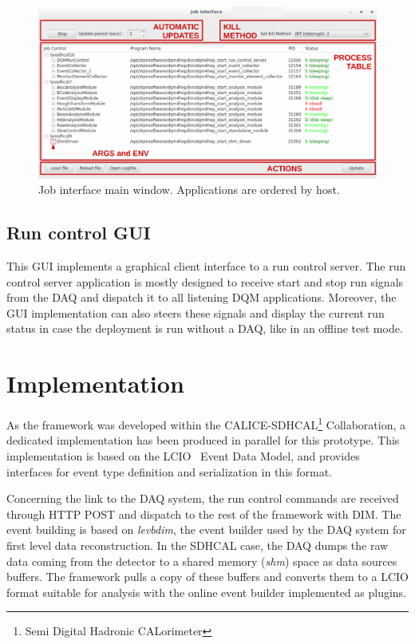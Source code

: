 \documentclass[conference]{IEEEtran}
\begin{document}
\begin{figure}[htbp]
  \begin{center}
    \includegraphics[width=.95\textwidth]{figs/JobControlInterface.pdf}
    \caption{\label{fig:JobControlGUI} Job interface main window. Applications are ordered by host.}
  \end{center}
\end{figure}

\subsection{Run control GUI}

This GUI implements a graphical client interface to a run control server. The run control server application is mostly designed to receive start and stop run signals from the DAQ and dispatch it to all listening DQM applications. Moreover, the GUI implementation can also steers these signals and display the current run status in case the deployment is run without a DAQ, like in an offline test mode.

\section{Implementation}

As the framework was developed within the CALICE-SDHCAL\footnote{Semi Digital Hadronic CALorimeter} Collaboration, a dedicated implementation has been produced in parallel for this prototype. This implementation is based on the LCIO~\cite{LCIO} Event Data Model, and provides interfaces for event type definition and serialization in this format.


Concerning the link to the DAQ system, the run control commands are received through HTTP POST and dispatch to the rest of the framework with DIM. The event building is based on \textit{levbdim}, the event builder used by the DAQ system for first level data reconstruction. In the SDHCAL case, the DAQ dumps the raw data coming from the detector to a shared memory (\textit{shm}) space as data sources buffers. The framework pulls a copy of these buffers and converts them to a LCIO format suitable for analysis with the online event builder implemented as plugins.
\end{document}
